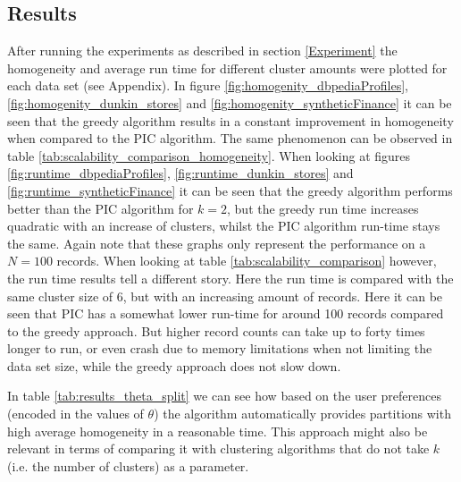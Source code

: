 \subsection{Results}
After running the experiments as described in section \ref{Experiment} the homogeneity and average run time for different cluster amounts were plotted for each data set (see Appendix).
In figure \ref{fig:homogenity_dbpediaProfiles}, \ref{fig:homogenity_dunkin_stores} and \ref{fig:homogenity_syntheticFinance} it can be seen that the greedy algorithm results in a constant improvement in homogeneity when compared to the PIC algorithm. The same phenomenon can be observed in table \ref{tab:scalability_comparison_homogeneity}. When looking at figures \ref{fig:runtime_dbpediaProfiles}, \ref{fig:runtime_dunkin_stores} and \ref{fig:runtime_syntheticFinance} it can be seen that the greedy algorithm performs better than the PIC algorithm for $k=2$, but the greedy run time increases quadratic with an increase of clusters, whilst the PIC algorithm run-time stays the same. Again note that these graphs only represent the performance on a $N = 100$ records. 
When looking at table \ref{tab:scalability_comparison} however, the run time results tell a different story. Here the run time is compared with the same cluster size of 6, but with an increasing amount of records. Here it can be seen that PIC has a somewhat lower run-time for around 100 records compared to the greedy approach. But higher record counts can take up to forty times longer to run, or even crash due to memory limitations when not limiting the data set size, while the greedy approach does not slow down.

In table \ref{tab:results_theta_split} we can see how based on the user preferences (encoded in the values of $\theta$) the algorithm automatically provides partitions with high average homogeneity in a reasonable time. This approach might also be relevant in terms of comparing it with clustering algorithms that do not take $k$ (i.e. the number of clusters) as a parameter. 

